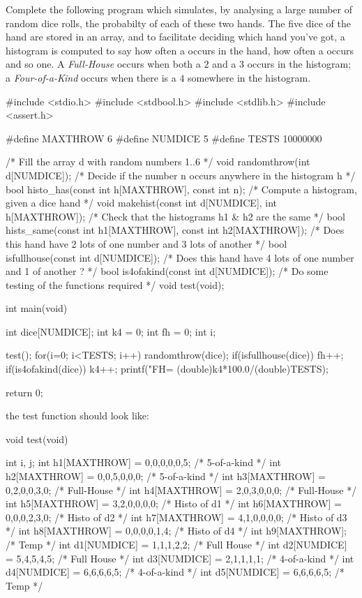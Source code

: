 \begin{exercise}
Complete the following program which simulates, by analysing a large number of random dice rolls, the probabilty of each of these two hands.
The five dice of the hand are stored in an array, and to facilitate deciding which hand you've got, a histogram is computed to say how often a  occurs in the hand, how often a  occurs and so one. A {\it Full-House} occurs when both a $2$ and a $3$ occurs in the histogram; a {\it Four-of-a-Kind} occurs when there is a $4$ somewhere in the histogram.
{\small
\begin{codesnippet}
#include <stdio.h>
#include <stdbool.h>
#include <stdlib.h>
#include <assert.h>

#define MAXTHROW 6
#define NUMDICE 5
#define TESTS 10000000

/* Fill the array d with random numbers 1..6 */
void randomthrow(int d[NUMDICE]);
/* Decide if the number n occurs anywhere in the histogram h */
bool histo_has(const int h[MAXTHROW], const int n);
/* Compute a histogram, given a dice hand */
void makehist(const int d[NUMDICE], int h[MAXTHROW]);
/* Check that the histograms h1 & h2 are the same */
bool hists_same(const int h1[MAXTHROW], const int h2[MAXTHROW]);
/* Does this hand have 2 lots of one number and 3 lots of another */
bool isfullhouse(const int d[NUMDICE]);
/* Does this hand have 4 lots of one number and 1 of another ? */
bool is4ofakind(const int d[NUMDICE]);
/* Do some testing of the functions required */
void test(void);

int main(void)
{

   int dice[NUMDICE];
   int k4 = 0;
   int fh = 0;
   int i;

   test();
   for(i=0; i<TESTS; i++){
      randomthrow(dice);
      if(isfullhouse(dice)){
        fh++;
      }
      if(is4ofakind(dice)){
        k4++;
      }
   }
   printf("FH=%
                                       (double)k4*100.0/(double)TESTS);

   return 0;
}
\end{codesnippet}
}

the test function should look like:
{\small
\begin{codesnippet}
void test(void)
{
   int i, j;
   int h1[MAXTHROW] = {0,0,0,0,0,5}; /* 5-of-a-kind */
   int h2[MAXTHROW] = {0,0,5,0,0,0}; /* 5-of-a-kind */
   int h3[MAXTHROW] = {0,2,0,0,3,0}; /* Full-House  */
   int h4[MAXTHROW] = {2,0,3,0,0,0}; /* Full-House  */
   int h5[MAXTHROW] = {3,2,0,0,0,0}; /* Histo of d1 */
   int h6[MAXTHROW] = {0,0,0,2,3,0}; /* Histo of d2 */
   int h7[MAXTHROW] = {4,1,0,0,0,0}; /* Histo of d3 */
   int h8[MAXTHROW] = {0,0,0,0,1,4}; /* Histo of d4 */
   int h9[MAXTHROW];                 /* Temp        */
   int d1[NUMDICE]  = {1,1,1,2,2};   /* Full House  */
   int d2[NUMDICE]  = {5,4,5,4,5};   /* Full House  */
   int d3[NUMDICE]  = {2,1,1,1,1};   /* 4-of-a-kind */
   int d4[NUMDICE]  = {6,6,6,6,5};   /* 4-of-a-kind */
   int d5[NUMDICE]  = {6,6,6,6,5};   /* Temp        */

}
\end{codesnippet}}
\end{exercise}
